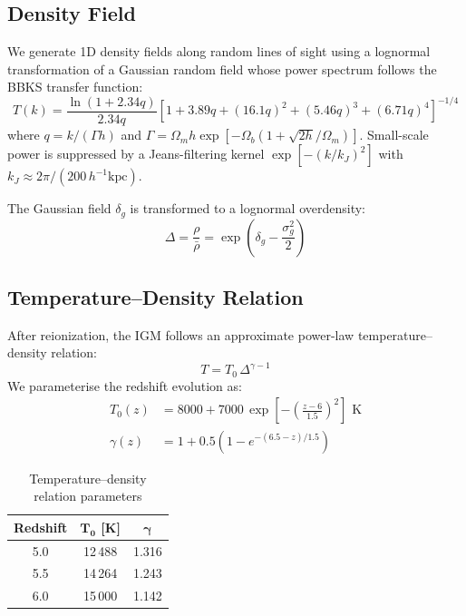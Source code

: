 \documentclass[11pt]{article}
\begin{document}
\subsection{Density Field}

We generate 1D density fields along random lines of sight using a lognormal transformation of a Gaussian random field whose power spectrum follows the BBKS transfer function:
\begin{equation}
    T(k) = \frac{\ln(1+2.34q)}{2.34q}\left[1 + 3.89q + (16.1q)^2 + (5.46q)^3 + (6.71q)^4\right]^{-1/4}
\end{equation}
where $q = k/(\Gamma h)$ and $\Gamma = \Omega_m h \exp[-\Omega_b(1+\sqrt{2h}/\Omega_m)]$. Small-scale power is suppressed by a Jeans-filtering kernel $\exp[-(k/k_J)^2]$ with $k_J \approx 2\pi/(200\,h^{-1}\text{kpc})$.

The Gaussian field $\delta_g$ is transformed to a lognormal overdensity:
\begin{equation}
    \Delta = \frac{\rho}{\bar\rho} = \exp\!\left(\delta_g - \frac{\sigma_g^2}{2}\right)
\end{equation}

\subsection{Temperature--Density Relation}

After reionization, the IGM follows an approximate power-law temperature--density relation:
\begin{equation}
    T = T_0\,\Delta^{\gamma-1}
\end{equation}
We parameterise the redshift evolution as:
\begin{align}
    T_0(z) &= 8000 + 7000\,\exp\!\left[-\left(\frac{z-6}{1.5}\right)^2\right] \text{ K} \\
    \gamma(z) &= 1 + 0.5\left(1 - e^{-(6.5-z)/1.5}\right)
\end{align}

\begin{table}[H]
\centering
\caption{Temperature--density relation parameters}
\label{tab:tdrel}
\begin{tabular}{@{}ccc@{}}
\toprule
\textbf{Redshift} & $\boldsymbol{T_0}$ \textbf{[K]} & $\boldsymbol{\gamma}$ \\
\midrule
5.0 & 12\,488 & 1.316 \\
5.5 & 14\,264 & 1.243 \\
6.0 & 15\,000 & 1.142 \\
\bottomrule
\end{tabular}
\end{table}
\end{document}
